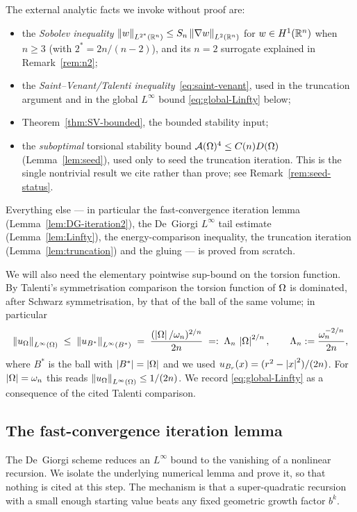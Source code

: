 The external analytic facts we invoke without proof are:
\begin{itemize}
\item the \emph{Sobolev inequality}
   $\left\|w\right\|_{L^{2^*}(\mathbb R^n)}\le S_n\left\|\nabla w\right\|_{L^2(\mathbb R^n)}$ for
   $w\in H^1(\mathbb R^n)$ when $n\ge3$ (with $2^*=2n/(n-2)$), and its $n=2$
   surrogate explained in Remark~\ref{rem:n2};
\item the \emph{Saint--Venant/Talenti inequality}~\eqref{eq:saint-venant},
   used in the truncation argument and in the global $L^\infty$ bound
   \eqref{eq:global-Linfty} below;
\item Theorem~\ref{thm:SV-bounded}, the bounded stability input;
\item the \emph{suboptimal} torsional stability bound
   $\mathcal A(\Omega)^4\le C(n)D(\Omega)$ (Lemma~\ref{lem:seed}), used only to seed
   the truncation iteration. This is the single nontrivial result we cite
   rather than prove; see Remark~\ref{rem:seed-status}.
\end{itemize}
Everything else --- in particular the fast-convergence iteration lemma
(Lemma~\ref{lem:DG-iteration2}), the De~Giorgi $L^\infty$ tail estimate
(Lemma~\ref{lem:Linfty}), the energy-comparison inequality, the truncation
iteration (Lemma~\ref{lem:truncation}) and the gluing --- is proved from
scratch.

We will also need the elementary pointwise sup-bound on the torsion
function. By Talenti's symmetrisation comparison the torsion function of
$\Omega$ is dominated, after Schwarz symmetrisation, by that of the ball of
the same volume; in particular
\begin{equation}\label{eq:global-Linfty}
   \left\|u_\Omega\right\|_{L^\infty(\Omega)}\;\le\;\left\|u_{B^*}\right\|_{L^\infty(B^*)}
   \;=\;\frac{(\left|\Omega\right|/\omega_n)^{2/n}}{2n}
   \;=:\;\Lambda_n\,\left|\Omega\right|^{2/n},
   \qquad \Lambda_n:=\frac{\omega_n^{-2/n}}{2n},
\end{equation}
where $B^*$ is the ball with $\left|B^*\right|=\left|\Omega\right|$ and we used
$u_{B_r}(x)=(r^2-\left|x\right|^2)/(2n)$. For $\left|\Omega\right|=\omega_n$ this reads
$\left\|u_\Omega\right\|_{L^\infty(\Omega)}\le 1/(2n)$. We record \eqref{eq:global-Linfty}
as a consequence of the cited Talenti comparison.

\subsection{The fast-convergence iteration lemma}\label{ssec:DG-lemma}

The De~Giorgi scheme reduces an $L^\infty$ bound to the vanishing of a
nonlinear recursion. We isolate the underlying numerical lemma and prove
it, so that nothing is cited at this step. The mechanism is that a
super-quadratic recursion with a small enough starting value beats any
fixed geometric growth factor $b^k$.

